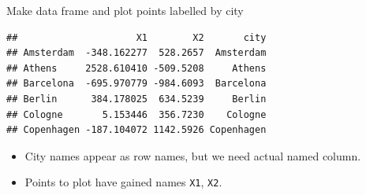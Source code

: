 \begin{frame}[fragile]{Make data frame and plot points labelled by city}
  
\begin{knitrout}\small
{}\color{fgcolor}\begin{kframe}
\begin{alltt}
\hlkwb{=}\hlstd{=europe[,}\hlstd{],}
\end{alltt}
\begin{verbatim}
##                     X1        X2       city
## Amsterdam  -348.162277  528.2657  Amsterdam
## Athens     2528.610410 -509.5208     Athens
## Barcelona  -695.970779 -984.6093  Barcelona
## Berlin      384.178025  634.5239     Berlin
## Cologne       5.153446  356.7230    Cologne
## Copenhagen -187.104072 1142.5926 Copenhagen
\end{verbatim}
\end{kframe}
\end{knitrout}

\begin{itemize}
\item City names appear as row names, but we need actual named column.
  
\item Points to plot have gained names \texttt{X1}, \texttt{X2}.
  
\begin{knitrout}
\color{fgcolor}\begin{kframe}
\begin{alltt}
\hlkwb{=}\hlstd{(}\hlopt{+}\hlstd{()}\hlopt{+}
  \hlstd{()}\hlopt{+}\hlstd{()}
\end{alltt}
\end{kframe}
\end{knitrout}
\end{itemize}
  
\end{frame}

